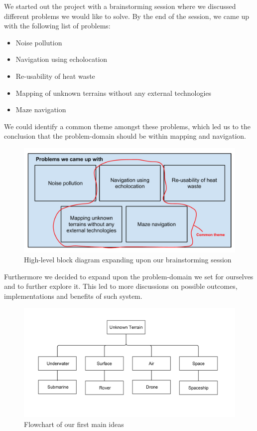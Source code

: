 We started out the project with a brainstorming session where we discussed different problems we would like to solve. By the end of the session, we came up with the following list of problems:
\begin{itemize}
	\item Noise pollution
	\item Navigation using echolocation
	\item Re-usability of heat waste
	\item Mapping of unknown terrains without any external technologies
	\item Maze navigation
\end{itemize}

We could identify a common theme amongst these problems, which led us to the conclusion that the problem-domain should be within mapping and navigation. 

\begin{figure}[!h]
	\centering
	\includegraphics[scale=.7]{images/high-level-block.pdf}
	\caption{High-level block diagram expanding upon our brainstorming session}
	\label{fig:highlevelblock}
\end{figure}

Furthermore we decided to expand upon the problem-domain we set for ourselves and to further explore it. This led to more discussions on possible outcomes, implementations and benefits of such system.

\begin{figure}[!h]
	\centering
	\includegraphics[scale=.1]{images/level1.png}
	\caption{Flowchart of our first main ideas}
	\label{fig:level1}
\end{figure}

